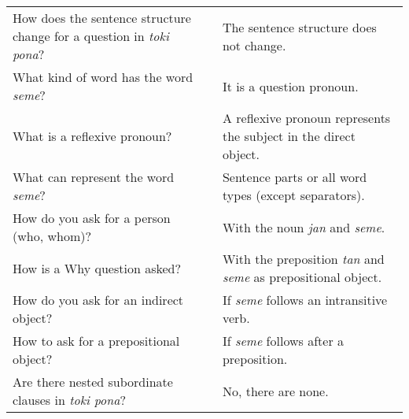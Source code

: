 \begin{supertabular}{p{5,5cm}|ll}
How does the sentence structure change for a question in \textit{toki pona}? && The sentence structure does not change. \\ %
What kind of word has the word \textit{seme}? && It is a question pronoun.  \\ %
What is a reflexive pronoun? && A reflexive pronoun represents the subject in the direct object. \\ %
What can represent the word \textit{seme}? && Sentence parts or all word types (except separators).  \\ %
How do you ask for a person (who, whom)? && With the noun \textit{jan} and \textit{seme}. \\ %
How is a Why question asked? && With the preposition \textit{tan} and \textit{seme} as prepositional object. \\ %
How do you ask for an indirect object? && If \textit{seme} follows an intransitive verb. \\ %
How to ask for a prepositional object? && If \textit{seme} follows after a preposition. \\ %
Are there nested subordinate clauses in \textit{toki pona}? && No, there are none. \\ %
\end{supertabular}

